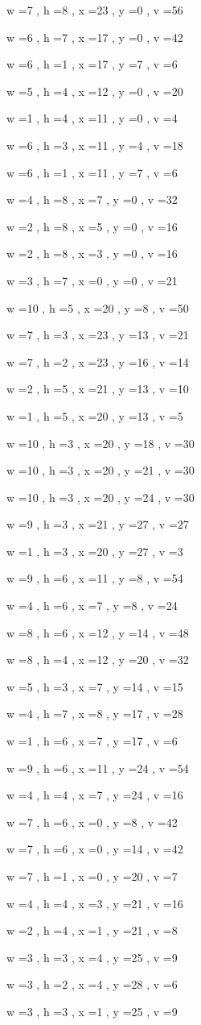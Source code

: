 \documentclass[11pt]{article}
\begin{document}
w =7 , h =8 , x =23 , y =0 , v =56
\par
w =6 , h =7 , x =17 , y =0 , v =42
\par
w =6 , h =1 , x =17 , y =7 , v =6
\par
w =5 , h =4 , x =12 , y =0 , v =20
\par
w =1 , h =4 , x =11 , y =0 , v =4
\par
w =6 , h =3 , x =11 , y =4 , v =18
\par
w =6 , h =1 , x =11 , y =7 , v =6
\par
w =4 , h =8 , x =7 , y =0 , v =32
\par
w =2 , h =8 , x =5 , y =0 , v =16
\par
w =2 , h =8 , x =3 , y =0 , v =16
\par
w =3 , h =7 , x =0 , y =0 , v =21
\par
w =10 , h =5 , x =20 , y =8 , v =50
\par
w =7 , h =3 , x =23 , y =13 , v =21
\par
w =7 , h =2 , x =23 , y =16 , v =14
\par
w =2 , h =5 , x =21 , y =13 , v =10
\par
w =1 , h =5 , x =20 , y =13 , v =5
\par
w =10 , h =3 , x =20 , y =18 , v =30
\par
w =10 , h =3 , x =20 , y =21 , v =30
\par
w =10 , h =3 , x =20 , y =24 , v =30
\par
w =9 , h =3 , x =21 , y =27 , v =27
\par
w =1 , h =3 , x =20 , y =27 , v =3
\par
w =9 , h =6 , x =11 , y =8 , v =54
\par
w =4 , h =6 , x =7 , y =8 , v =24
\par
w =8 , h =6 , x =12 , y =14 , v =48
\par
w =8 , h =4 , x =12 , y =20 , v =32
\par
w =5 , h =3 , x =7 , y =14 , v =15
\par
w =4 , h =7 , x =8 , y =17 , v =28
\par
w =1 , h =6 , x =7 , y =17 , v =6
\par
w =9 , h =6 , x =11 , y =24 , v =54
\par
w =4 , h =4 , x =7 , y =24 , v =16
\par
w =7 , h =6 , x =0 , y =8 , v =42
\par
w =7 , h =6 , x =0 , y =14 , v =42
\par
w =7 , h =1 , x =0 , y =20 , v =7
\par
w =4 , h =4 , x =3 , y =21 , v =16
\par
w =2 , h =4 , x =1 , y =21 , v =8
\par
w =3 , h =3 , x =4 , y =25 , v =9
\par
w =3 , h =2 , x =4 , y =28 , v =6
\par
w =3 , h =3 , x =1 , y =25 , v =9
\par
\newpage
\end{document}
